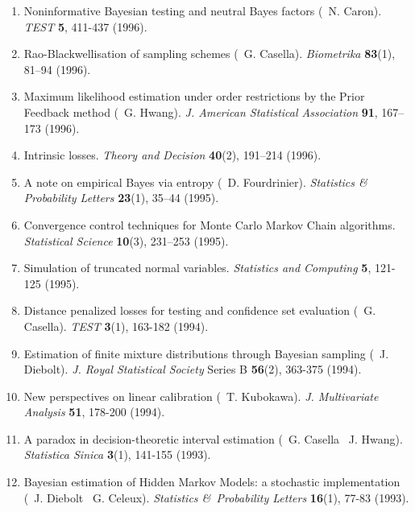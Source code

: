 \begin{enumerate}
\item Noninformative Bayesian testing and neutral Bayes
factors (\avec\  N. Caron). %
{\it TEST} {\bf 5}, 411-437 (1996). 

\item Rao-Blackwellisation of sampling schemes (\avec\ G. Casella).
{\it Biometrika} {\bf 83}(1), 81--94 (1996).

\item Maximum likelihood estimation under order restrictions by 
the Prior Feedback method (\avec\  G. Hwang). {\it J.
American Statistical Association} {\bf 91}, 167--173 (1996).

\item Intrinsic losses. {\it Theory and Decision} {\bf 40}(2), 191--214 (1996).

\item A note on empirical Bayes via entropy (\avec\  D. Fourdrinier).
{\it Statistics \& Probability Letters} {\bf 23}(1), 35--44 (1995). 

\item Convergence control techniques for Monte Carlo Markov Chain 
algorithms. {\it Statistical Science} {\bf 10}(3), 231--253 (1995).

\item Simulation of truncated normal variables. 
{\it Statistics and Computing} {\bf 5}, 121-125 (1995).

\item Distance penalized losses for testing and confidence set evaluation
(\avec\  G. Casella). {\it TEST} {\bf 3}(1), 163-182 (1994).

\item Estimation of finite mixture distributions through Bayesian sampling (\avec\ 
J. Die\-bolt). {\it J. Royal Statistical Society} Series B
{\bf 56}(2), 363-375 (1994).

\item New perspectives on linear calibration (\avec\  T. Kubokawa). 
{\it J. Multivariate Analysis} {\bf 51}, 178-200 (1994).

\item A paradox in decision-theoretic interval estimation (\avec\  G. Casella \et\  J.
Hwang). {\it Statistica Sinica} {\bf 3}(1), 141-155 (1993).

\item Bayesian estimation of Hidden Markov Models: a stochastic implementation
(\avec\  J. Diebolt \et\  G. Celeux). {\it Statistics \&\ Probability 
Letters} {\bf 16}(1), 77-83 (1993). 


\end{enumerate}
